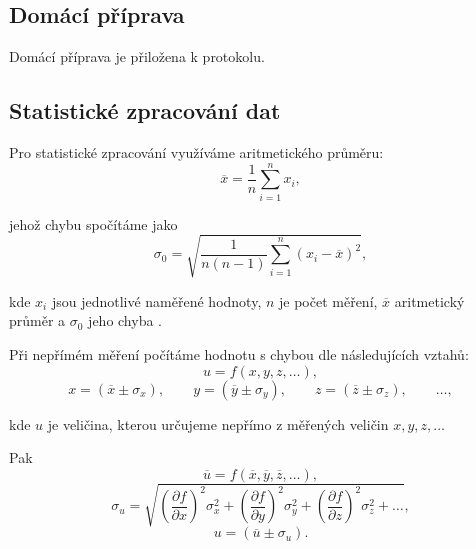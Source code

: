 \documentclass[english]{article}
\begin{document}
\subsection{Domácí příprava}
	Domácí příprava je přiložena k protokolu.
\subsection{Statistické zpracování dat}
	Pro statistické zpracování využíváme aritmetického průměru:
	\begin{equation} \label{eq:aritmeticky_prumer}
	\overline{x} = \frac{1}{n}\sum\limits_{i=1}^{n}x_i,
	\end{equation}
	
	jehož chybu spočítáme jako 
	\begin{equation} \label{eq:chyba_aritmetickeho_prumeru}
	\sigma_0 = \sqrt{\frac{1}{n(n-1)} \sum\limits_{i=1}^{n}\left( x_i - \overline{x} \right)^2 },
	\end{equation}
	
	kde $ x_i $ jsou jednotlivé naměřené hodnoty, $ n $ je počet měření, $ \overline{x} $ aritmetický průměr a $ \sigma_0 $ jeho chyba \cite{bib:chyby}.
	
Při nepřímém měření počítáme hodnotu s chybou dle následujících vztahů:
	\begin{equation}
	u = f(x, y, z, \ldots),
	\end{equation}
	\begin{displaymath}
	x = (\overline{x} \pm \sigma_x), \qquad
	y = (\overline{y} \pm \sigma_y), \qquad
	z = (\overline{z} \pm \sigma_z), \qquad
	\ldots,
	\end{displaymath}
	
	kde $ u $ je veličina, kterou určujeme nepřímo z měřených veličin $ x, y, z, \ldots $ 
	
	Pak
	\begin{displaymath}
	\overline{u} = f(\overline{x}, \overline{y}, \overline{z}, \ldots),
	\end{displaymath}
	\begin{equation}\label{eq:chyba_neprime_mereni}
	\sigma_u = \sqrt{\left( \frac{\partial f}{\partial x} \right)^2 \sigma^2_x + \left( \frac{\partial f}{\partial y} \right)^2 \sigma^2_y + \left( \frac{\partial f}{\partial z} \right)^2 \sigma^2_z + \ldots},
	\end{equation}
	\begin{displaymath}
	u = (\overline{u} \pm \sigma_ u).
	\end{displaymath}
	
\end{document}
